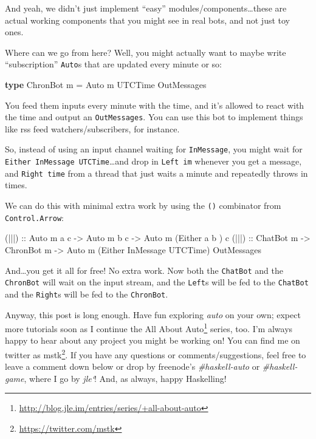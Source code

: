 \documentclass[]{article}
\newenvironment{Shaded}{}{}
\newcommand{\KeywordTok}[1]{\textcolor[rgb]{0.00,0.44,0.13}{\textbf{{#1}}}}
\newcommand{\DataTypeTok}[1]{\textcolor[rgb]{0.56,0.13,0.00}{{#1}}}
\newcommand{\OtherTok}[1]{\textcolor[rgb]{0.00,0.44,0.13}{{#1}}}
\newcommand{\FunctionTok}[1]{\textcolor[rgb]{0.02,0.16,0.49}{{#1}}}
\newcommand{\NormalTok}[1]{{#1}}
\renewcommand{\href}[2]{#2\footnote{\url{#1}}}
\begin{document}
And yeah, we didn't just implement ``easy'' modules/components\ldots{}these are
actual working components that you might see in real bots, and not just toy
ones.

Where can we go from here? Well, you might actually want to maybe write
``subscription'' \texttt{Auto}s that are updated every minute or so:

\begin{Shaded}
\begin{Highlighting}[]
\KeywordTok{type} \DataTypeTok{ChronBot} \NormalTok{m }\FunctionTok{=} \DataTypeTok{Auto} \NormalTok{m }\DataTypeTok{UTCTime} \DataTypeTok{OutMessages}
\end{Highlighting}
\end{Shaded}

You feed them inputs every minute with the time, and it's allowed to react with
the time and output an \texttt{OutMessages}. You can use this bot to implement
things like rss feed watchers/subscribers, for instance.

So, instead of using an input channel waiting for \texttt{InMessage}, you might
wait for \texttt{Either\ InMessage\ UTCTime}\ldots{}and drop in
\texttt{Left\ im} whenever you get a message, and \texttt{Right\ time} from a
thread that just waits a minute and repeatedly throws in times.

We can do this with minimal extra work by using the
\texttt{(\textbar{}\textbar{}\textbar{})} combinator from
\texttt{Control.Arrow}:

\begin{Shaded}
\begin{Highlighting}[]
\OtherTok{(|||) ::} \DataTypeTok{Auto} \NormalTok{m a c }\OtherTok{->} \DataTypeTok{Auto} \NormalTok{m b c }\OtherTok{->} \DataTypeTok{Auto} \NormalTok{m (}\DataTypeTok{Either} \NormalTok{a         b      ) c}
\OtherTok{(|||) ::} \DataTypeTok{ChatBot} \NormalTok{m  }\OtherTok{->} \DataTypeTok{ChronBot} \NormalTok{m }\OtherTok{->} \DataTypeTok{Auto} \NormalTok{m (}\DataTypeTok{Either} \DataTypeTok{InMessage} \DataTypeTok{UTCTime}\NormalTok{) }\DataTypeTok{OutMessages}
\end{Highlighting}
\end{Shaded}

And\ldots{}you get it all for free! No extra work. Now both the \texttt{ChatBot}
and the \texttt{ChronBot} will wait on the input stream, and the \texttt{Left}s
will be fed to the \texttt{ChatBot} and the \texttt{Right}s will be fed to the
\texttt{ChronBot}.

Anyway, this post is long enough. Have fun exploring \emph{auto} on your own;
expect more tutorials soon as I continue the
\href{http://blog.jle.im/entries/series/+all-about-auto}{All About Auto} series,
too. I'm always happy to hear about any project you might be working on! You can
find me on twitter as \href{https://twitter.com/mstk}{mstk}. If you have any
questions or comments/suggestions, feel free to leave a comment down below or
drop by freenode's \emph{\#haskell-auto} or \emph{\#haskell-game}, where I go by
\emph{jle`}! And, as always, happy Haskelling!
\end{document}
